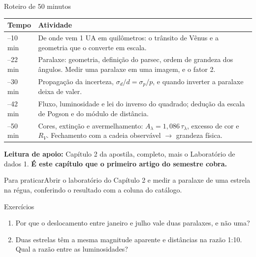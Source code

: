 \documentclass[11pt,a4paper]{article}
\newcommand{\atividade}[1]{\begin{lessonblock}[borderline west={2pt}{0pt}{astroGold}]{Para praticar}#1\end{lessonblock}}
\newcommand{\exercicios}[1]{\begin{lessonblock}[borderline west={2pt}{0pt}{astroBlue}]{Exercícios}\begin{enumerate}#1\end{enumerate}\end{lessonblock}\medskip}
\begin{document}
\begin{lessonblock}{Roteiro de 50 minutos}
\begin{tabular}{>{\raggedright\arraybackslash}p{}>{\raggedright\arraybackslash}p{}}
\toprule
Tempo & Atividade \\
\midrule
0--10 min & De onde vem 1 UA em quilômetros: o trânsito de Vênus e a geometria que o converte em escala. \\
10--22 min & Paralaxe: geometria, definição do parsec, ordem de grandeza dos ângulos. Medir uma paralaxe em uma imagem, e o fator 2. \\
22--30 min & Propagação da incerteza, $\sigma_d/d=\sigma_p/p$, e quando inverter a paralaxe deixa de valer. \\
30--42 min & Fluxo, luminosidade e lei do inverso do quadrado; dedução da escala de Pogson e do módulo de distância. \\
42--50 min & Cores, extinção e avermelhamento: $A_\lambda=1{,}086\,\tau_\lambda$, excesso de cor e $R_V$. Fechamento com a cadeia observável $\rightarrow$ grandeza física. \\
\bottomrule
\end{tabular}

\textbf{Leitura de apoio:} Capítulo 2 da apostila, completo, mais o Laboratório de dados 1. \textbf{É este capítulo que o primeiro artigo do semestre cobra.}
\end{lessonblock}
\atividade{Abrir o laboratório do Capítulo 2 e medir a paralaxe de uma estrela na régua, conferindo o resultado com a coluna do catálogo.}
\exercicios{
\item Por que o deslocamento entre janeiro e julho vale duas paralaxes, e não uma?
\item Duas estrelas têm a mesma magnitude aparente e distâncias na razão 1:10. Qual a razão entre as luminosidades?
}
\end{document}
